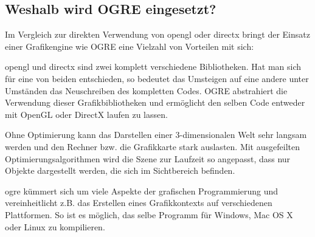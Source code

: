 \newpage
\subsection{Weshalb wird OGRE eingesetzt?}

Im Vergleich zur direkten Verwendung von \gls{opengl} oder \gls{directx} bringt der Einsatz einer Grafikengine wie OGRE eine Vielzahl von Vorteilen mit sich:

 \gls{opengl} und \gls{directx} sind zwei komplett verschiedene Bibliotheken. Hat man sich für eine von beiden entschieden, so bedeutet das Umsteigen auf eine andere unter Umständen das Neuschreiben des kompletten Codes. OGRE abstrahiert die Verwendung dieser Grafikbibliotheken und ermöglicht den selben Code entweder mit OpenGL oder DirectX laufen zu lassen.

 Ohne Optimierung kann das Darstellen einer 3-dimensionalen Welt sehr langsam werden und den Rechner bzw. die Grafikkarte stark auslasten. Mit ausgefeilten Optimierungsalgorithmen wird die Szene zur Laufzeit so angepasst, dass nur Objekte dargestellt werden, die sich im Sichtbereich befinden.

 \gls{ogre} kümmert sich um viele Aspekte der grafischen Programmierung und vereinheitlicht z.B. das Erstellen eines Grafikkontexts auf verschiedenen Plattformen. So ist es möglich, das selbe Programm für Windows, Mac OS X oder Linux zu kompilieren. 

